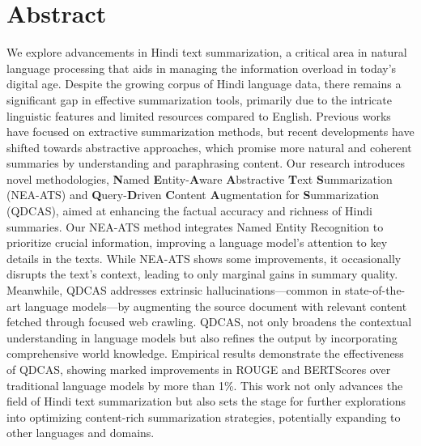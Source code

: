 \chapter*{Abstract}

We explore advancements in Hindi text summarization, a critical area in natural language processing that aids in managing the information overload in today's digital age. Despite the growing corpus of Hindi language data, there remains a significant gap in effective summarization tools, primarily due to the intricate linguistic features and limited resources compared to English. Previous works have focused on extractive summarization methods, but recent developments have shifted towards abstractive approaches, which promise more natural and coherent summaries by understanding and paraphrasing content. Our research introduces novel methodologies, \textbf{N}amed \textbf{E}ntity-\textbf{A}ware \textbf{A}bstractive \textbf{T}ext \textbf{S}ummarization (NEA-ATS) and \textbf{Q}uery-\textbf{D}riven \textbf{C}ontent \textbf{A}ugmentation for \textbf{S}ummarization (QDCAS), aimed at enhancing the factual accuracy and richness of Hindi summaries. Our NEA-ATS method integrates Named Entity Recognition to prioritize crucial information, improving a language model's attention to key details in the texts.  While NEA-ATS shows some improvements, it occasionally disrupts the text's context, leading to only marginal gains in summary quality.  Meanwhile, QDCAS addresses extrinsic hallucinations—common in state-of-the-art language models—by augmenting the source document with relevant content fetched through focused web crawling. QDCAS, not only broadens the contextual understanding in language models but also refines the output by incorporating comprehensive world knowledge. Empirical results demonstrate the effectiveness of QDCAS, showing marked improvements in ROUGE and BERTScores over traditional language models by more than 1\%. This work not only advances the field of Hindi text summarization but also sets the stage for further explorations into optimizing content-rich summarization strategies, potentially expanding to other languages and domains.
